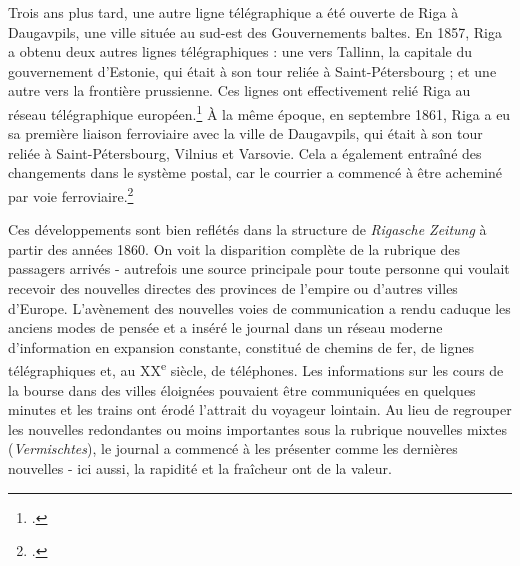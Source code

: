\documentclass[a4paper,twoside,12pt]{article}
\begin{document}
Trois ans plus tard, une autre ligne télégraphique a été ouverte de Riga à Daugavpils, une ville située au sud-est des Gouvernements baltes. En 1857, Riga a obtenu deux autres lignes télégraphiques : une vers Tallinn, la capitale du gouvernement d'Estonie, qui était à son tour reliée à Saint-Pétersbourg ; et une autre vers la frontière prussienne. Ces lignes ont effectivement relié Riga au réseau télégraphique européen.\footcite[151]{petersone_vidzemes_1998} À la même époque, en septembre 1861, Riga a eu sa première liaison ferroviaire avec la ville de Daugavpils, qui était à son tour reliée à Saint-Pétersbourg, Vilnius et Varsovie. Cela a également entraîné des changements dans le système postal, car le courrier a commencé à être acheminé par voie ferroviaire.\footcite[153]{petersone_vidzemes_1998}

Ces développements sont bien reflétés dans la structure de \textit{Rigasche Zeitung} à partir des années 1860. On voit la disparition complète de la rubrique des passagers arrivés - autrefois une source principale pour toute personne qui voulait recevoir des nouvelles directes des provinces de l'empire ou d'autres villes d'Europe. L'avènement des nouvelles voies de communication a rendu caduque les anciens modes de pensée et a inséré le journal dans un réseau moderne d'information en expansion constante, constitué de chemins de fer, de lignes télégraphiques et, au XX\textsuperscript{e} siècle, de téléphones. Les informations sur les cours de la bourse dans des villes éloignées pouvaient être communiquées en quelques minutes et les trains ont érodé l'attrait du voyageur lointain. Au lieu de regrouper les nouvelles redondantes ou moins importantes sous la rubrique \og nouvelles mixtes \fg{} (\textit{Vermischtes}), le journal a commencé à les présenter comme les \og dernières nouvelles \fg{} - ici aussi, la rapidité et la fraîcheur ont de la valeur.
\end{document}
